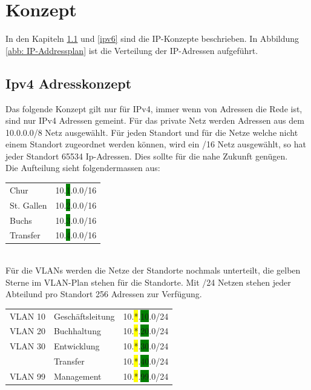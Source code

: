 \documentclass[11pt,a4paper]{scrreprt}
\begin{document}
\chapter{Konzept}
In den Kapiteln \ref{ipv4} und \ref{ipv6} sind die IP-Konzepte beschrieben. In Abbildung \ref{abb: IP-Addressplan} ist die Verteilung der IP-Adressen aufgeführt.
\section{Ipv4 Adresskonzept} \label{ipv4}
Das folgende Konzept gilt nur für IPv4, immer wenn von Adressen die Rede ist, sind nur IPv4 Adressen gemeint.
Für das private Netz werden Adressen aus dem 10.0.0.0/8 Netz ausgewählt. Für jeden Standort und für die Netze welche nicht einem Standort zugeordnet werden können, wird ein /16 Netz ausgewählt, so hat jeder Standort 65534 Ip-Adressen. Dies sollte für die nahe Zukunft genügen.\\
\newline
Die Aufteilung sieht folgendermassen aus: \\
\newline
\hspace*{1cm} 
\begin{tabular}{ll}
    Chur & 10.\colorbox{green}{1}.0.0/16\\
    St. Gallen & 10.\colorbox{green}{2}.0.0/16\\
    Buchs & 10.\colorbox{green}{3}.0.0/16\\
    Transfer & 10.\colorbox{green}{4}.0.0/16\\
\end{tabular}\\
\newline
Für die \acs{VLAN}s werden die Netze der Standorte nochmals unterteilt, die gelben Sterne im \acs{VLAN}-Plan stehen für die Standorte. Mit /24 Netzen stehen jeder Abteilund pro Standort 256 Adressen zur Verfügung.\\
\newline
\hspace*{1cm} 
\begin{tabular}{lll}
     \acs{VLAN} 10 & Geschäftsleitung & 10.\colorbox{yellow}{*}.\colorbox{green}{10}.0/24\\
     \acs{VLAN} 20 & Buchhaltung & 10.\colorbox{yellow}{*}.\colorbox{green}{20}.0/24\\
     \acs{VLAN} 30 & Entwicklung & 10.\colorbox{yellow}{*}.\colorbox{green}{30}.0/24\\
             & Transfer & 10.\colorbox{yellow}{*}.\colorbox{green}{40}.0/24\\
     \acs{VLAN} 99 & Management & 10.\colorbox{yellow}{*}.\colorbox{green}{99}.0/24\\
\end{tabular}
\newpage
\end{document}
